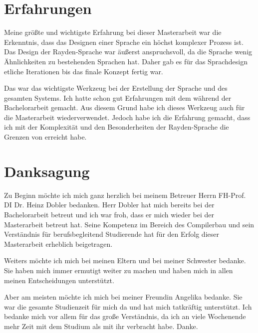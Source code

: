 \section{Erfahrungen}

Meine größte und wichtigste Erfahrung bei dieser Masterarbeit war die Erkenntnis, dass das Designen einer Sprache ein höchst komplexer Prozess ist. Das Design der Rayden-Sprache war äußerst anspruchsvoll, da die Sprache wenig Ähnlichkeiten zu bestehenden Sprachen hat. Daher gab es für das Sprachdesign etliche Iterationen bis das finale Konzept fertig war.

\SuperPar
Das  war das wichtigste Werkzeug bei der Erstellung der Sprache und des gesamten Systems. Ich hatte schon gut Erfahrungen mit dem  während der Bachelorarbeit gemacht. Aus diesem Grund habe ich dieses Werkzeug auch für die Masterarbeit wiederverwendet. Jedoch habe ich die Erfahrung gemacht, dass ich mit der Komplexität und den Besonderheiten der Rayden-Sprache die Grenzen von  erreicht habe.

\section{Danksagung}

Zu Beginn möchte ich mich ganz herzlich bei meinem Betreuer Herrn FH-Prof. DI Dr. Heinz Dobler bedanken. Herr Dobler hat mich bereits bei der Bachelorarbeit betreut und ich war froh, dass er mich wieder bei der Masterarbeit betreut hat. Seine Kompetenz im Bereich des Compilerbau und sein Verständnis für berufsbegleitend Studierende hat für den Erfolg dieser Masterarbeit erheblich beigetragen. 

\SuperPar
Weiters möchte ich mich bei meinen Eltern und bei meiner Schwester bedanke. Sie haben mich immer ermutigt weiter zu machen und haben mich in allen meinen Entscheidungen unterstützt.

\SuperPar
Aber am meisten möchte ich mich bei meiner Freundin Angelika bedanke. Sie war die gesamte Studienzeit für mich da und hat mich tatkräftig unterstützt. Ich bedanke mich vor allem für das große Verständnis, da ich an viele Wochenende mehr Zeit mit dem Studium als mit ihr verbracht habe. Danke.
